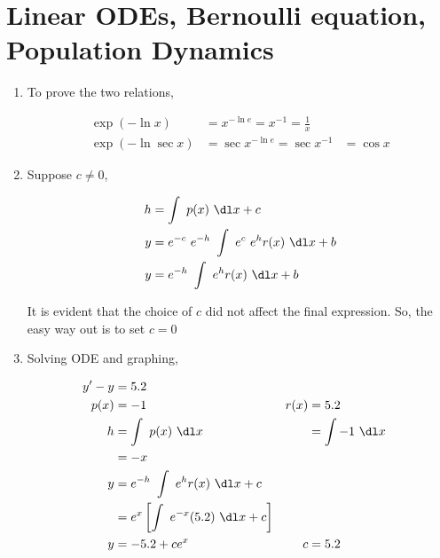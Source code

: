 \section{Linear ODEs, Bernoulli equation, Population Dynamics}

\begin{enumerate}
    \item To prove the two relations,

          \begin{align}
              \exp(-\ln x)      & = x^{-\ln e} = x^{-1} = \frac{1}{x}            \\
              \exp(-\ln \sec x) & = \sec x ^{-\ln e} = \sec x ^{-1}   & = \cos x
          \end{align}


    \item Suppose $ c \neq 0 $,

          \begin{align}
              h & = \int\ p(x)\ \dl x + c                             \\
              y & = e^{-c}\ e^{-h}\ \int\ e^{c}\ e^{h}r(x)\ \dl x + b \\
              y & = e^{-h}\ \int\ e^{h}r(x)\ \dl x + b
          \end{align}

          It is evident that the choice of $ c $ did not affect the final expression.
          So, the easy way out is to set $ c = 0 $

    \item Solving ODE and graphing,

          \begin{align}
              y'  - y & = 5.2                                                                          \\
              p(x)    & = -1                                                 & r(x) & = 5.2            \\
              h       & = \int\ p(x)\ \dl x                                  &      & = \int -1\ \dl x \\
                      & = -x                                                                           \\
              y       & = e^{-h}\ \int\ e^{h}r(x)\ \dl x + c                                           \\
                      & = e^{x} \left[ \int\ e^{-x} (5.2)\ \dl x + c \right]                           \\
              y       & = -5.2 + ce^{x}                                      & c    & = 5.2
          \end{align}


\end{enumerate}
